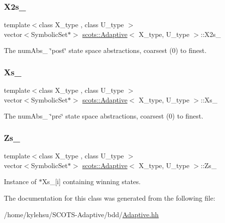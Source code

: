 \subsubsection{\texorpdfstring{X2s\+\_\+}{X2s\_}}
{\footnotesize\ttfamily template$<$class X\+\_\+type , class U\+\_\+type $>$ \\
vector$<$Symbolic\+Set$\ast$$>$ \hyperlink{classscots_1_1Adaptive}{scots\+::\+Adaptive}$<$ X\+\_\+type, U\+\_\+type $>$\+::X2s\+\_\+}

The num\+Abs\+\_\+ \char`\"{}post\char`\"{} state space abstractions, coarsest (0) to finest. \mbox{\label{classscots_1_1Adaptive_ae43471177bc6b7d3229a9497b46ee343}} 
\subsubsection{\texorpdfstring{Xs\+\_\+}{Xs\_}}
{\footnotesize\ttfamily template$<$class X\+\_\+type , class U\+\_\+type $>$ \\
vector$<$Symbolic\+Set$\ast$$>$ \hyperlink{classscots_1_1Adaptive}{scots\+::\+Adaptive}$<$ X\+\_\+type, U\+\_\+type $>$\+::Xs\+\_\+}

The num\+Abs\+\_\+ \char`\"{}pre\char`\"{} state space abstractions, coarsest (0) to finest. \mbox{\label{classscots_1_1Adaptive_a387e00a300c8c75d3a4eb6181dfab9c4}} 
\subsubsection{\texorpdfstring{Zs\+\_\+}{Zs\_}}
{\footnotesize\ttfamily template$<$class X\+\_\+type , class U\+\_\+type $>$ \\
vector$<$Symbolic\+Set$\ast$$>$ \hyperlink{classscots_1_1Adaptive}{scots\+::\+Adaptive}$<$ X\+\_\+type, U\+\_\+type $>$\+::Zs\+\_\+}

Instance of $\ast$\+Xs\+\_\+\mbox{[}i\mbox{]} containing winning states. 

The documentation for this class was generated from the following file\+:\begin{DoxyCompactItemize}
\item 
/home/kylehsu/\+S\+C\+O\+T\+S-\/\+Adaptive/bdd/\hyperlink{Adaptive_8hh}{Adaptive.\+hh}\end{DoxyCompactItemize}
